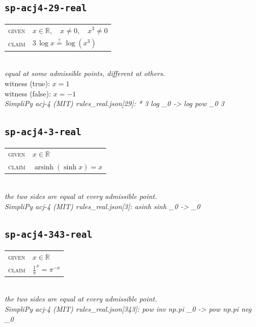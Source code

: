 \documentclass[11pt]{article}
\begin{document}
\subsection*{\texttt{sp-acj4-29-real}}
\begin{tabular}{@{}l@{\quad}l@{}}
\textsc{given} & $x \in \mathbb{R},\quad x \neq 0,\quad x^{3} \neq 0$ \\[4pt]
\textsc{claim} & $\displaystyle 3 \, \log x \overset{?}{=} \log\left(x^{3}\right)$ \\
\end{tabular}\\[2pt]
{\small\emph{equal at some admissible points, different at others.}}\\
{\footnotesize\color{gray}witness (true): $x = 1$}\\
{\footnotesize\color{gray}witness (false): $x = -1$}\\
\emph{SimpliPy acj-4 (MIT) rules\_real.json[29]: * 3 log \_0  ->  log pow \_0 3}\\

\subsection*{\texttt{sp-acj4-3-real}}
\begin{tabular}{@{}l@{\quad}l@{}}
\textsc{given} & $x \in \mathbb{R}$ \\[4pt]
\textsc{claim} & $\displaystyle \operatorname{arsinh}\left(\sinh x\right) = x$ \\
\end{tabular}\\[2pt]
{\small\emph{the two sides are equal at every admissible point.}}\\
\emph{SimpliPy acj-4 (MIT) rules\_real.json[3]: asinh sinh \_0  ->  \_0}\\

\subsection*{\texttt{sp-acj4-343-real}}
\begin{tabular}{@{}l@{\quad}l@{}}
\textsc{given} & $x \in \mathbb{R}$ \\[4pt]
\textsc{claim} & $\displaystyle \frac{1}{\pi}^{x} = \pi^{-x}$ \\
\end{tabular}\\[2pt]
{\small\emph{the two sides are equal at every admissible point.}}\\
\emph{SimpliPy acj-4 (MIT) rules\_real.json[343]: pow inv np.pi \_0  ->  pow np.pi neg \_0}\\
\end{document}

